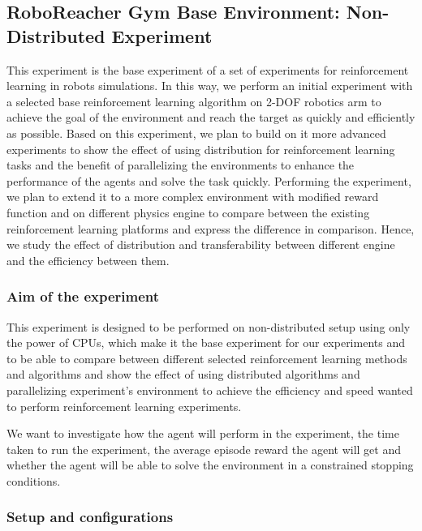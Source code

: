 
\subsection{RoboReacher Gym Base Environment: Non-Distributed Experiment}

This experiment is the base experiment of a set of experiments for reinforcement learning in robots simulations.
In this way, we perform an initial experiment with a selected base reinforcement learning algorithm on 2-DOF robotics arm to achieve the goal of the environment and reach the target as quickly and efficiently as possible.
Based on this experiment, we plan to build on it more advanced experiments to show the effect of using distribution for reinforcement learning tasks and the benefit of parallelizing the environments to enhance the performance of the agents and solve the task quickly. Performing the experiment, we plan to extend it to a more complex environment with modified reward function and on different physics engine to compare between the existing reinforcement learning platforms and express the difference in comparison. Hence, we study the effect of distribution and transferability between different engine and the efficiency between them.

\subsubsection{Aim of the experiment}

This experiment is designed to be performed on non-distributed setup using only the power of CPUs, which make it the base experiment for our experiments and to be able to compare between different selected reinforcement learning methods and algorithms and show the effect of using distributed algorithms and parallelizing experiment's environment to achieve the efficiency and speed wanted to perform reinforcement learning experiments. 

We want to investigate how the agent will perform in the experiment, the time taken to run the experiment, the average episode reward the agent will get and whether the agent will be able to solve the environment in a constrained stopping conditions.

\subsubsection{Setup and configurations}

